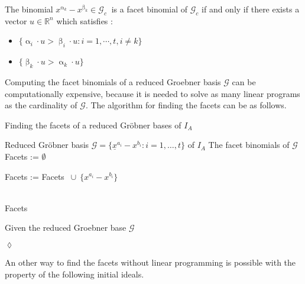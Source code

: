 \begin{env_definition}
\cite{tigers}
The binomial $x^{\upalpha_{k}}-x^{\upbeta_k} \in \mathcal{G}_c~$ is a facet binomial of $\mathcal{G}_c$ if and only if there exists a vector $u \in \mathbb{R}^{n}$ which satisfies :

\begin{itemize}
\item
$ \lbrace \upalpha_{i} \cdot u > \upbeta_{i} \cdot u : i = 1, \cdots , t, i \neq k \rbrace  
$
\item
$ \lbrace \upbeta_{k} \cdot u > \upalpha_{k} \cdot u \rbrace $
\end{itemize}


\end{env_definition}
Computing the facet binomials of a reduced Groebner basis $\mathcal{G}$ can be computationally expensive, because it is needed to solve as many linear programs as the cardinality of $\mathcal{G}$. The algorithm for finding the facets can be as follows.



\begin{algorithm}
\caption{Finding the facets of a reduced Gröbner bases of $I_A$ \cite{tigers}}
\label{alg:facetsLP}
\begin{algorithmic}[1]

\Require
Reduced Gröbner basis $ \mathcal{G} = \lbrace \underline{x}^{a_{i}} - {x}^{b_{i}} : i = 1,\dots,t  \rbrace $ of $I_A$
\Ensure The facet binomials of $\mathcal{G}$
\State Facets := $\emptyset$

\State Facets := Facets $~\cup~\{{x}^{a_{i}} - {x}^{b_{i}} \} $
\EndIf

\EndFor \\
\Return Facets
\end{algorithmic}
\end{algorithm}

\begin{env_example}\normalfont
Given the reduced Groebner base $\mathcal{G}$

\begin{flushright}
$\lozenge$
\end{flushright}
\end{env_example}

An other way to find the facets without linear programming is possible with the property of the following initial ideals.

